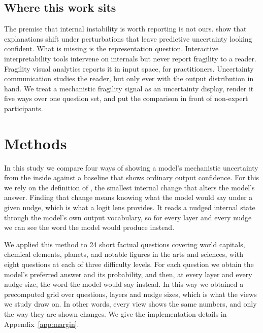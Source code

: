\documentclass[sigconf]{acmart}
\begin{document}
\subsection{Where this work sits}

The premise that internal instability is worth reporting is not ours.
\citet{marjanovicInvestigatingImpactModel2024} show that explanations shift under perturbations that leave
predictive uncertainty looking confident. What is missing is the representation question. Interactive
interpretability tools intervene on internals but never report fragility to a reader. Fragility visual analytics
reports it in input space, for practitioners. Uncertainty communication studies the reader, but only ever with
the output distribution in hand. We treat a mechanistic fragility signal as an uncertainty display, render it
five ways over one question set, and put the comparison in front of non-expert participants.

\color{black}
\section{Methods}

In this study we compare four ways of showing a model's mechanistic uncertainty from the inside against a
baseline that shows ordinary output confidence. For this we rely on the definition of
\citet{komanduriMeasuringMechanisticUncertainty2026}, the smallest internal change that alters the model's
answer. Finding that change means knowing what the model would say under a given nudge, which is what a logit
lens provides. It reads a nudged internal state through the model's own output vocabulary, so for every layer
and every nudge we can see the word the model would produce instead.

We applied this method to 24 short factual questions covering world capitals, chemical elements, planets, and
notable figures in the arts and sciences, with eight questions at each of three difficulty levels. For each
question we obtain the model's preferred answer and its probability, and then, at every layer and every nudge
size, the word the model would say instead. In this way we obtained a precomputed grid over questions, layers
and nudge sizes, which is what the views we study draw on. In other words, every view shows the same numbers,
and only the way they are shown changes. We give the implementation details in Appendix~\ref{app:margin}.
\end{document}
